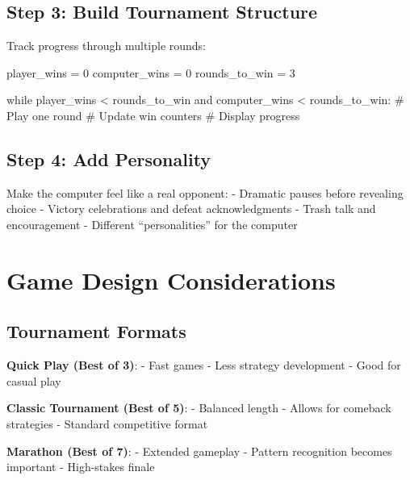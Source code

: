 \documentclass[
  letterpaper,
  DIV=11,
  numbers=noendperiod,
  oneside]{scrreprt}
\newenvironment{Shaded}{}{}
\newcommand{\CommentTok}[1]{\textcolor[rgb]{0.42,0.45,0.49}{#1}}
\newcommand{\ControlFlowTok}[1]{\textcolor[rgb]{0.84,0.23,0.29}{#1}}
\newcommand{\DecValTok}[1]{\textcolor[rgb]{0.00,0.36,0.77}{#1}}
\newcommand{\KeywordTok}[1]{\textcolor[rgb]{0.84,0.23,0.29}{#1}}
\newcommand{\NormalTok}[1]{\textcolor[rgb]{0.14,0.16,0.18}{#1}}
\newcommand{\OperatorTok}[1]{\textcolor[rgb]{0.14,0.16,0.18}{#1}}
\begin{document}
\subsection{Step 3: Build Tournament
Structure}\label{step-3-build-tournament-structure}

Track progress through multiple rounds:

\begin{Shaded}
\begin{Highlighting}[]
\NormalTok{player\_wins }\OperatorTok{=} \DecValTok{0}
\NormalTok{computer\_wins }\OperatorTok{=} \DecValTok{0}
\NormalTok{rounds\_to\_win }\OperatorTok{=} \DecValTok{3}

\ControlFlowTok{while}\NormalTok{ player\_wins }\OperatorTok{\textless{}}\NormalTok{ rounds\_to\_win }\KeywordTok{and}\NormalTok{ computer\_wins }\OperatorTok{\textless{}}\NormalTok{ rounds\_to\_win:}
    \CommentTok{\# Play one round}
    \CommentTok{\# Update win counters}
    \CommentTok{\# Display progress}
\end{Highlighting}
\end{Shaded}

\subsection{Step 4: Add Personality}\label{step-4-add-personality}

Make the computer feel like a real opponent: - Dramatic pauses before
revealing choice - Victory celebrations and defeat acknowledgments -
Trash talk and encouragement - Different ``personalities'' for the
computer

\section{Game Design Considerations}\label{game-design-considerations-1}

\subsection{Tournament Formats}\label{tournament-formats}

\textbf{Quick Play (Best of 3)}: - Fast games - Less strategy
development - Good for casual play

\textbf{Classic Tournament (Best of 5)}: - Balanced length - Allows for
comeback strategies - Standard competitive format

\textbf{Marathon (Best of 7)}: - Extended gameplay - Pattern recognition
becomes important - High-stakes finale
\end{document}
